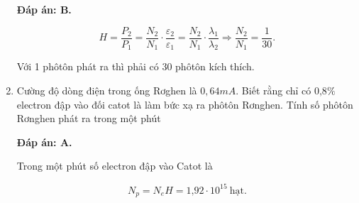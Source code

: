 \begin{enumerate}[label=\bfseries Câu \arabic*:]
	\loigiai
	{		\textbf{Đáp án: B.}
		
		$$H = \dfrac{P_2}{P_1} = \dfrac{N_2}{N_1} \cdot \dfrac{\varepsilon_2}{\varepsilon_1} = \dfrac{N_2}{N_1} \cdot \dfrac{\lambda_1}{\lambda_2} \Rightarrow \dfrac{N_2}{N_1} = \dfrac{1}{30}.$$
		
		Với 1 phôtôn phát ra thì phải có 30 phôtôn kích thích. 
	}
		\item {}
		\cauhoi
	{Cường độ dòng điện trong ống Rơghen là $0,64 mA$. Biết rằng chỉ có $\text{0,8}\%$ electron đập vào đối catot là làm bức xạ ra phôtôn Rơnghen. Tính số phôtôn Rơnghen phát ra trong một phút
		
	}
	
	\loigiai
	{		\textbf{Đáp án: A.}
		
		Trong một phút số electron đập vào Catot là
		
		$$N_p = N_e H = \text{1,92} \cdot 10^{15}\ \text{hạt}.$$
	}
\end{enumerate}
